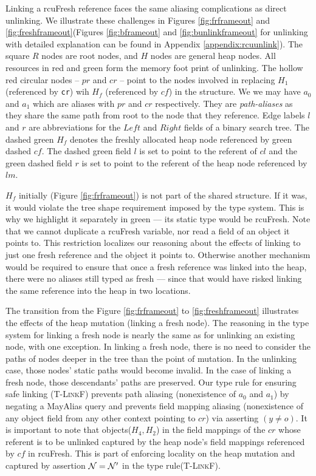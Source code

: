 Linking a \textsf{rcuFresh} reference faces the same aliasing complications as direct unlinking.
We illustrate these challenges in Figures \ref{fig:frframeout} and \ref{fig:freshframeout}(Figures \ref{fig:bframeout} and \ref{fig:bunlinkframeout} for unlinking with detailed explanation can be found in Appendix \ref{appendix:rcuunlink}).
The square $R$ nodes are root nodes, and $H$ nodes are general heap nodes.
All resources in red and green form the memory foot print of unlinking. The hollow red circular nodes -- $pr$ and $cr$ -- point to the nodes involved in replacing $H_1$ (referenced by \texttt{cr}) wih $H_f$ (referenced by $cf$) in the structure.
We we may have $a_0$ and $a_1$ which are aliases with $pr$ and $cr$ respectively. They are \textit{path-aliases} as they share the same path from root to the node that they reference. 
Edge labels $l$ and $r$ are abbreviations for the $Left$ and $Right$ fields of a binary search tree.
The dashed green $H_f$ denotes the freshly allocated heap node referenced by green dashed  $cf$. The dashed green field $l$ is set to point to the referent of $cl$ and the green dashed field $r$ is set to point to the referent of the heap node referenced by $lm$.

$H_f$ initially (Figure \ref{fig:frframeout}) is not part of the shared structure.  If it was, it would violate the tree shape requirement imposed by the type system.  This is why we highlight it separately in green --- its static type would be \textsf{rcuFresh}.
Note that we cannot duplicate a \textsf{rcuFresh} variable, nor read a field of an object it points to.
This restriction localizes our reasoning about the effects of linking to just one fresh reference and the object it points to.
Otherwise another mechanism would be required to ensure that once a fresh reference was linked into the heap, there were no aliases still typed as fresh --- since that would have risked linking the same reference into the heap in two locations.

The transition from the Figure \ref{fig:frframeout} to \ref{fig:freshframeout} illustrates the effects of the heap mutation (linking a fresh node). The reasoning in the type system for linking a fresh node is nearly the same as for unlinking an existing node, with one exception.
In linking a fresh node, there is no need to consider the paths of nodes deeper in the tree than the point of mutation.  In the unlinking case, those nodes' static paths would become invalid.  In the case of linking a fresh node, those descendants' paths are preserved.
Our type rule for ensuring safe linking (\textsc{T-LinkF}) prevents path aliasing (nonexistence of $a_0$ and $a_1$) by negating a \textsf{MayAlias} query and prevents field mapping aliasing (nonexistence of any object field from any other context pointing to $cr$) via asserting $(y\neq o)$. It is important to note that objects($H_4,H_2$) in the field mappings of the $cr$ whose referent is to be unlinked captured by the heap node's field mappings referenced by $cf$ in \textsf{rcuFresh}. This is part of enforcing locality on the heap mutation and captured by assertion $\mathcal{N} = \mathcal{N}'$ in the type rule(\textsc{T-LinkF}). 
 
